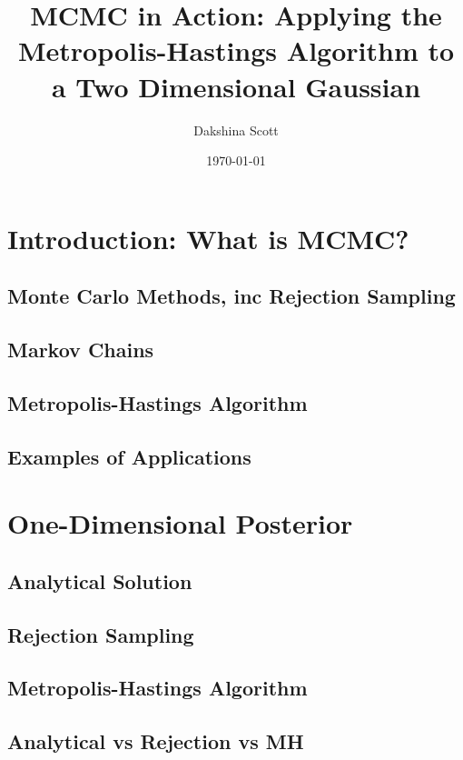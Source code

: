 \documentclass[a4paper,11pt,twoside]{article}
\begin{document}
\title{MCMC in Action: Applying the Metropolis-Hastings Algorithm to 
a Two Dimensional Gaussian}
\date{\today}
\author{Dakshina Scott}
\maketitle

\begin{abstract}
\end{abstract}

\tableofcontents

\section{Introduction: What is MCMC?}
\subsection{Monte Carlo Methods, inc Rejection Sampling}
\subsection{Markov Chains}
\subsection{Metropolis-Hastings Algorithm}
\subsection{Examples of Applications}

\section{One-Dimensional Posterior}
\subsection{Analytical Solution}
\subsection{Rejection Sampling}
\subsection{Metropolis-Hastings Algorithm}
\subsection{Analytical vs Rejection vs MH}
\end{document}
